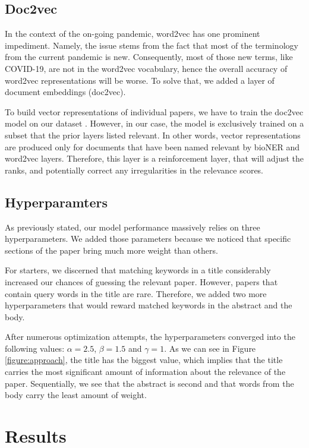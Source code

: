 \documentclass[10pt, a4paper]{article}
\begin{document}
	\subsection{Doc2vec}
	
In the context of the on-going pandemic, word2vec has one prominent impediment. Namely, the issue stems from the fact that most of the terminology from the current pandemic is new. Consequently, most of those new terms, like COVID-19, are not in the word2vec vocabulary, hence the overall accuracy of word2vec representations will be worse. To solve that, we added a layer of document embeddings (doc2vec). 

To build vector representations of individual papers, we have to train the doc2vec model on our dataset \cite{le2014distributed}. However, in our case, the model is exclusively trained on a subset that the prior layers listed relevant. In other words, vector representations are produced only for documents that have been named relevant by bioNER and word2vec layers. Therefore, this layer is a reinforcement layer, that will adjust the ranks, and potentially correct any irregularities in the relevance scores.

\subsection{Hyperparamters}

As previously stated, our model performance massively relies on three hyperparameters. We added those parameters because we noticed that specific sections of the paper bring much more weight than others. 

For starters, we discerned that matching keywords in a title considerably increased our chances of guessing the relevant paper. However, papers that contain query words in the title are rare. Therefore, we added two more hyperparameters that would reward matched keywords in the abstract and the body. 

After numerous optimization attempts, the hyperparameters converged into the following values: $\alpha = 2.5$, $\beta = 1.5$ and $\gamma = 1$. As we can see in Figure \ref{figure:approach}, the title has the biggest value, which implies that the title carries the most significant amount of information about the relevance of the paper. Sequentially, we see that the abstract is second and that words from the body carry the least amount of weight.


	
	\section{Results}
	
\end{document}

